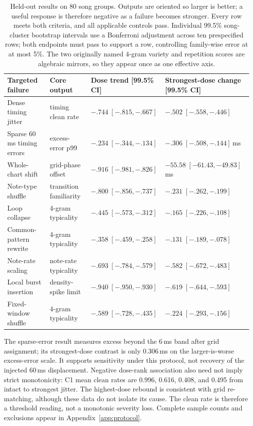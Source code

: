 \documentclass[10pt,twocolumn]{article}
\begin{document}
\begin{table}[t]
\centering
\scriptsize
\setlength{\tabcolsep}{3.5pt}
\begin{tabular}{@{}p{}p{}p{}p{}@{}}
\toprule
Targeted failure & Core output & Dose trend [99.5\% CI] &
Strongest-dose change [99.5\% CI] \\
\midrule
Dense timing jitter & timing clean rate & $-.744\;[-.815,-.667]$ & $-.502\;[-.558,-.446]$ \\
Sparse 60\,ms timing errors & excess-error p99 & $-.234\;[-.344,-.134]$ & $-.306\;[-.508,-.144]$\,ms \\
Whole-chart shift & grid-phase offset & $-.916\;[-.981,-.826]$ & $-55.58\;[-61.43,-49.83]$\,ms \\
Note-type shuffle & transition familiarity & $-.800\;[-.856,-.737]$ & $-.231\;[-.262,-.199]$ \\
Loop collapse & 4-gram typicality & $-.445\;[-.573,-.312]$ & $-.165\;[-.226,-.108]$ \\
Common-pattern rewrite & 4-gram typicality & $-.358\;[-.459,-.258]$ & $-.131\;[-.189,-.078]$ \\
Note-rate scaling & note-rate typicality & $-.693\;[-.784,-.579]$ & $-.582\;[-.672,-.483]$ \\
Local burst insertion & density-spike limit & $-.940\;[-.950,-.930]$ & $-.619\;[-.644,-.593]$ \\
Fixed-window shuffle & 4-gram typicality & $-.589\;[-.728,-.435]$ & $-.224\;[-.293,-.156]$ \\
\bottomrule
\end{tabular}
\caption{Held-out results on 80 song groups. Outputs are oriented so larger is
better; a useful response is therefore negative as a failure becomes stronger.
Every row meets both criteria, and all applicable controls pass. Individual
99.5\% song-cluster bootstrap intervals use a Bonferroni adjustment across ten
prespecified rows; both endpoints must pass to support a row, controlling
family-wise error at at most 5\%.
The two originally named 4-gram variety and repetition scores are algebraic
mirrors, so they appear once as one effective axis.}
\label{tab:confirmation}
\end{table}

The sparse-error result measures excess beyond the 6\,ms band after grid
assignment; its strongest-dose contrast is only 0.306\,ms on the
larger-is-worse excess-error scale. It supports sensitivity under this protocol, not
recovery of the injected 60\,ms displacement. Negative dose-rank association
also need not imply strict monotonicity: C1 mean clean rates are 0.996, 0.616,
0.408, and 0.495 from intact to strongest jitter. The highest-dose rebound is
consistent with grid re-matching, although these data do not isolate its
cause. The clean rate is therefore a threshold reading, not a monotonic
severity loss. Complete sample counts and exclusions appear in
Appendix~\ref{app:protocol}.
\end{document}
